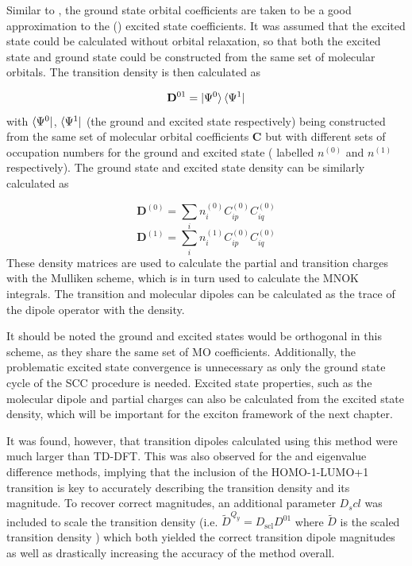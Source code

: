 Similar to \dscf, the ground state orbital coefficients are taken to be a good approximation
to the (\Qy) excited state coefficients. It was assumed that the excited state could
be calculated without orbital relaxation, so that both the excited state and ground
state could be constructed from the same set of molecular orbitals. The transition
density is then calculated as

\begin{equation}
\mathbf{D}^{01} = \ket{\Psi^0} \bra{\Psi^1} 
\end{equation}
%
with $\bra{\Psi^0}$, $\bra{\Psi^1}$ (the ground and excited state respectively)
being constructed from the same set of molecular orbital coefficients $\mathbf{C}$
but with different sets of occupation numbers for the ground and excited state (
labelled $n^{\left(0\right)}$ and $n^{\left(1\right)}$ respectively). The ground state
and excited state density can be similarly calculated as

\begin{equation}
\mathbf{D}^{\left(0\right)} = \sum_i n^{\left(0\right)}_i C^{\left(0\right)}_{ip} C^{\left(0\right)}_{iq}
\end{equation}
%
\begin{equation}
    \mathbf{D}^{\left(1\right)} = \sum_i n^{\left(1\right)}_i C^{\left(0\right)}_{ip} C^{\left(0\right)}_{iq} 
\end{equation}
%
These density matrices are used to calculate the partial and transition charges
with the Mulliken scheme, which is in turn used to calculate the MNOK integrals.
The transition and molecular dipoles can be calculated as the trace of the dipole
operator with the density.

It should be noted the ground and excited states would be orthogonal in this scheme,
as they share the same set of MO coefficients. Additionally, the problematic excited
state convergence is unnecessary as only the ground state cycle of the SCC procedure 
is needed. Excited state properties, such as the molecular dipole and partial charges 
can also be calculated from the excited state density, which will be important for 
the exciton framework of the next chapter.

It was found, however, that transition dipoles calculated using this method were
much larger than TD-DFT. This was also observed for the \dscf and eigenvalue
difference methods, implying that the inclusion of the HOMO-1-LUMO+1 transition
is key to accurately describing the transition density and its magnitude. To recover
correct magnitudes, an additional parameter $D_scl$ was included to scale the transition
density (i.e. $\tilde{D}^{Q_y} = D_{\text{scl}} D^{01}$  where $\tilde{D}$ is the
scaled transition density ) which both yielded the correct transition dipole magnitudes
as well as drastically increasing the accuracy of the method overall.

